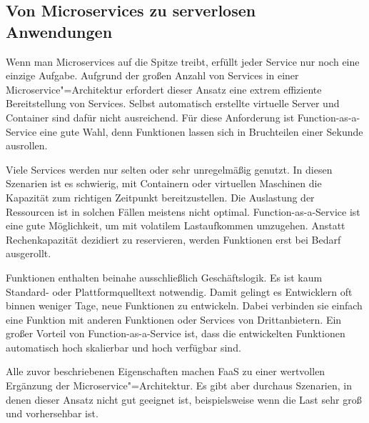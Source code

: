\subsection{Von Microservices zu serverlosen Anwendungen}

Wenn man Microservices auf die Spitze treibt, erfüllt jeder Service nur noch eine einzige Aufgabe. Aufgrund der großen Anzahl von Services in einer Microservice"=Architektur erfordert dieser Ansatz eine extrem effiziente Bereitstellung von Services. Selbst automatisch erstellte virtuelle Server und Container sind dafür nicht ausreichend. Für diese Anforderung ist Function-as-a-Service eine gute Wahl, denn Funktionen lassen sich in Bruchteilen einer Sekunde ausrollen.

Viele Services werden nur selten oder sehr unregelmäßig genutzt. In diesen Szenarien ist es schwierig, mit Containern oder virtuellen Maschinen die Kapazität zum richtigen Zeitpunkt bereitzustellen. Die Auslastung der Ressourcen ist in solchen Fällen meistens nicht optimal. Function-as-a-Service ist eine gute Möglichkeit, um mit volatilem Lastaufkommen umzugehen. Anstatt Rechenkapazität dezidiert zu reservieren, werden Funktionen erst bei Bedarf ausgerollt.

Funktionen enthalten beinahe ausschließlich Geschäftslogik. Es ist kaum Standard- oder Plattformquelltext notwendig. Damit gelingt es Entwicklern oft binnen weniger Tage, neue Funktionen zu entwickeln. Dabei verbinden sie einfach eine Funktion mit anderen Funktionen oder Services von Drittanbietern. Ein großer Vorteil von Function-as-a-Service ist, dass die entwickelten Funktionen automatisch hoch skalierbar und hoch verfügbar sind.

Alle zuvor beschriebenen Eigenschaften machen FaaS zu einer wertvollen Ergänzung der Microservice"=Architektur. Es gibt aber durchaus Szenarien, in denen dieser Ansatz nicht gut geeignet ist, beispielsweise wenn die Last sehr groß und vorhersehbar ist.